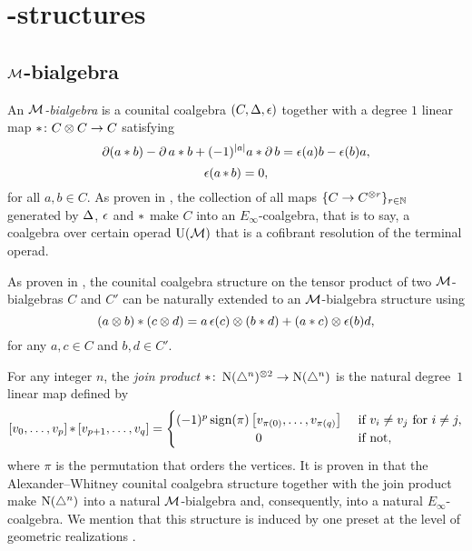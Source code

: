

\section{\pdfEinfty-structures}

\TBW

\subsection{$\mathcal{M}$-bialgebra}\label{ss:e-infty extension}

An \textit{$\mathcal{M}$-bialgebra} is a counital coalgebra $(C, \operatorname{\Delta}, \operatorname{\epsilon})$ together with a degree $1$ linear map $\operatorname{\ast} \colon C \otimes C \to C$ satisfying
\[
\operatorname{\partial} (a \ast b) - \operatorname{\partial} a \ast b + (-1)^{\lvert a\rvert} a \ast \operatorname{\partial} b =
\operatorname{\epsilon}(a) b - \operatorname{\epsilon}(b) a,
\]
\[
\operatorname{\epsilon} (a \operatorname{\ast} b) = 0,
\]
for all $a, b \in C$.
As proven in \cite{medina2020prop1}, the collection of all maps $\{C \to C^{\otimes r}\}_{r \in \mathbb{N}}$ generated by $\operatorname{\Delta}$, $\operatorname{\epsilon}$ and $\operatorname{\ast}$ make $C$ into an $E_\infty$-coalgebra, that is to say, a coalgebra over certain operad ${\operatorname{U}(\mathcal{M})}$ that is a cofibrant resolution of the terminal operad.

As proven in \cite{medina2021cobar}, the counital coalgebra structure on the tensor product of two $\mathcal{M}$-bialgebras $C$ and $C'$ can be naturally extended to an $\mathcal{M}$-bialgebra structure using
\begin{equation}\label{eq:monoidal_product}
	(a \otimes b) \ast (c \otimes d) =
	a \operatorname{\epsilon}(c) \otimes (b \ast d) + (a \ast c) \otimes \operatorname{\epsilon}(b) d,
\end{equation}
for any $a,c \in C$ and $b,d \in C'$.

For any integer $n$, the \textit{join product} $\ast \colon \operatorname{N}(\triangle^n)^{\otimes 2} \to \operatorname{N}(\triangle^n)$ is the natural degree~$1$ linear map defined by
\begin{equation*}
	\left[v_0, \dots, v_p \right] \pr \left[v_{p+1}, \dots, v_q\right] =
	\begin{cases} (-1)^{p} \sign(\pi) \left[v_{\pi(0)}, \dots, v_{\pi(q)}\right] & \text{ if } v_i \neq v_j \text{ for } i \neq j, \\
		\hfil 0 & \text{ if not}, \end{cases}
\end{equation*}
where $\pi$ is the permutation that orders the vertices.
It is proven in \cite{medina2020prop1} that the Alexander--Whitney counital coalgebra structure together with the join product make $\operatorname{N}(\triangle^n)$ into a natural $\mathcal{M}$-bialgebra and, consequently, into a natural $E_\infty$-coalgebra.
We mention that this structure is induced by one preset at the level of geometric realizations \cite{medina2021prop2}.

